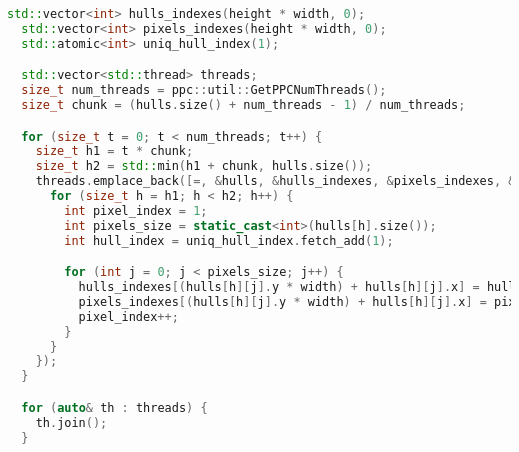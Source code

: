 \documentclass[12pt]{article}
\begin{document}
\label{appendix:stl_4}
\begin{lstlisting}[language=C++, caption={STL-версия, Формирование единой структуры ответа в функции PackHulls()}]
  std::vector<int> hulls_indexes(height * width, 0);
  std::vector<int> pixels_indexes(height * width, 0);
  std::atomic<int> uniq_hull_index(1);

  std::vector<std::thread> threads;
  size_t num_threads = ppc::util::GetPPCNumThreads();
  size_t chunk = (hulls.size() + num_threads - 1) / num_threads;

  for (size_t t = 0; t < num_threads; t++) {
    size_t h1 = t * chunk;
    size_t h2 = std::min(h1 + chunk, hulls.size());
    threads.emplace_back([=, &hulls, &hulls_indexes, &pixels_indexes, &uniq_hull_index]() {
      for (size_t h = h1; h < h2; h++) {
        int pixel_index = 1;
        int pixels_size = static_cast<int>(hulls[h].size());
        int hull_index = uniq_hull_index.fetch_add(1);

        for (int j = 0; j < pixels_size; j++) {
          hulls_indexes[(hulls[h][j].y * width) + hulls[h][j].x] = hull_index;
          pixels_indexes[(hulls[h][j].y * width) + hulls[h][j].x] = pixel_index;
          pixel_index++;
        }
      }
    });
  }

  for (auto& th : threads) {
    th.join();
  }
\end{lstlisting}

\newpage
\end{document}

